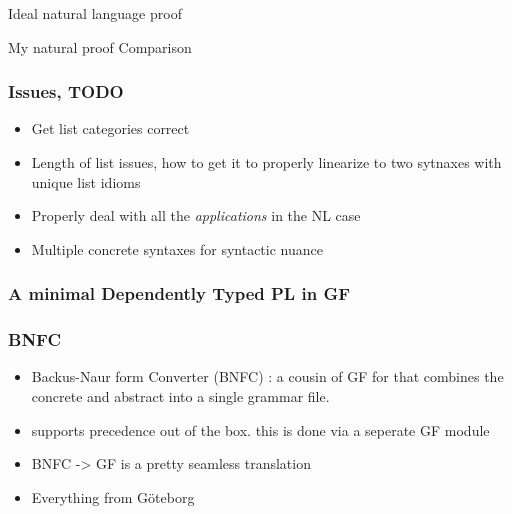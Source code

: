 \documentclass[10pt]{beamer}
\begin{document}
\begin{frame}



\end{frame}


\begin{frame}


Ideal natural language proof

My natural proof
Comparison



\end{frame}

\begin{frame}
\frametitle{Issues, TODO}

\begin{itemize}
\item Get list categories correct
\item Length of list issues, how to get it to properly linearize to two sytnaxes
  with unique list idioms 
\item Properly deal with all the \emph{applications} in the NL case
\item Multiple concrete syntaxes for syntactic nuance
\end{itemize}
\end{frame}

\begin{frame}
\frametitle{A minimal Dependently Typed PL in GF}

\begin{itemize}
\end{itemize}

\end{frame}

\begin{frame}

\frametitle{BNFC}

\begin{itemize}
\item Backus-Naur form Converter (BNFC) : a cousin of GF for that combines the concrete and abstract
  into a single grammar file.
\item supports precedence out of the box. this is done via a seperate GF module 
\item BNFC -> GF is a pretty seamless translation
\item Everything from Göteborg 
\end{itemize}

\end{frame}
\end{document}
